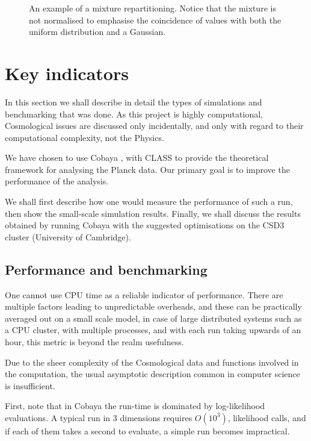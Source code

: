 \documentclass[usenatbib]{mnras}
\begin{document}
\begin{figure}
 
\caption{\label{orga504aba}
    An example of a mixture repartitioning. Notice that the mixture is not normalised to emphasise the coincidence of values with both the uniform distribution and a Gaussian.}
\end{figure}



\section{Key indicators}
\label{sec:org100d73d}
In this section we shall describe in detail the types of simulations
and benchmarking that was done. As this project is highly
computational, Cosmological issues are discussed only incidentally,
and only with regard to their computational complexity, not the
Physics.

We have chosen to use Cobaya \citep{cobaya}, with CLASS to provide the
theoretical framework for analysing the Planck \citep{planck}
data. Our primary goal is to improve the performance of the
analysis.

We shall first describe how one would measure the performance of
such a run, then show the small-scale simulation results. Finally,
we shall discuss the results obtained by running Cobaya with the
suggested optimisations on the CSD3 cluster (University of Cambridge).


\subsection{Performance and benchmarking}
\label{sec:orgd9f0053}
One cannot use CPU time as a reliable indicator of
performance. There are multiple factors leading to unpredictable
overheads, and these can be practically averaged out on a small
scale model, in case of large distributed systems such as a CPU
cluster, with multiple processes, and with each run taking upwards
of an hour, this metric is beyond the realm usefulness.

Due to the sheer complexity of the Cosmological data and functions
involved in the computation, the usual asymptotic description
common in computer science is insufficient. 

First, note that in Cobaya  the run-time is dominated
by log-likelihood evaluations. A typical run in 3 dimensions
requires \(O(10^{3})\), likelihood calls, and if each of them takes a
second to evaluate, a simple run becomes impractical. 
\end{document}
